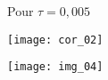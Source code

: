 \begin{multicols}{2}
Pour $\tau  = 0,005$


\begin{center}
\texttt{[image: cor\_02]}
\end{center}


\else
\fi



%
%
%
%
%
%
%
%
\ifprof
\else
\end{multicols}
\fi



\ifprof
\else
\begin{center}
\texttt{[image: img\_04]}
\end{center}
\fi

%
%
%
